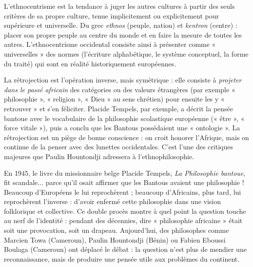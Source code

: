 \documentclass[11pt]{article}
\newcommand{\cle}[1]{{\popxbold\color{popdark}#1}}
\begin{document}
\begin{definition}[Ethnocentrisme]
L'\cle{ethnocentrisme} est la tendance à juger les autres cultures à partir des seuls critères de sa propre culture, tenue implicitement ou explicitement pour supérieure et universelle. Du grec \emph{ethnos} (peuple, nation) et \emph{kentron} (centre) : placer son propre peuple au centre du monde et en faire la mesure de toutes les autres. L'ethnocentrisme occidental consiste ainsi à présenter comme « universelles » des normes (l'écriture alphabétique, le système conceptuel, la forme du traité) qui sont en réalité historiquement européennes.
\end{definition}

\begin{definition}[Rétrojection]
La \cle{rétrojection} est l'opération inverse, mais symétrique : elle consiste à \emph{projeter dans le passé africain} des catégories ou des valeurs étrangères (par exemple « philosophie », « religion », « Dieu » au sens chrétien) pour ensuite les y « retrouver » et s'en féliciter. Placide Tempels, par exemple, a décrit la pensée bantoue avec le vocabulaire de la philosophie scolastique européenne (« être », « force vitale »), puis a conclu que les Bantous possédaient une « ontologie ». La rétrojection est un piège de bonne conscience : on croit honorer l'Afrique, mais on continue de la penser avec des lunettes occidentales. C'est l'une des critiques majeures que Paulin Hountondji adressera à l'ethnophilosophie.
\end{definition}

\begin{savaistu}
En 1945, le livre du missionnaire belge Placide Tempels, \emph{La Philosophie bantoue}, fit scandale... parce qu'il osait affirmer que les Bantous avaient une philosophie ! Beaucoup d'Européens le lui reprochèrent ; beaucoup d'Africains, plus tard, lui reprochèrent l'inverse : d'avoir enfermé cette philosophie dans une vision folklorique et collective. Ce double procès montre à quel point la question touche au nerf de l'identité : pendant des décennies, dire « philosophie africaine » était soit une provocation, soit un drapeau. Aujourd'hui, des philosophes comme Marcien Towa (Cameroun), Paulin Hountondji (Bénin) ou Fabien Eboussi Boulaga (Cameroun) ont déplacé le débat : la question n'est plus de mendier une reconnaissance, mais de produire une pensée utile aux problèmes du continent.
\end{savaistu}
\end{document}
